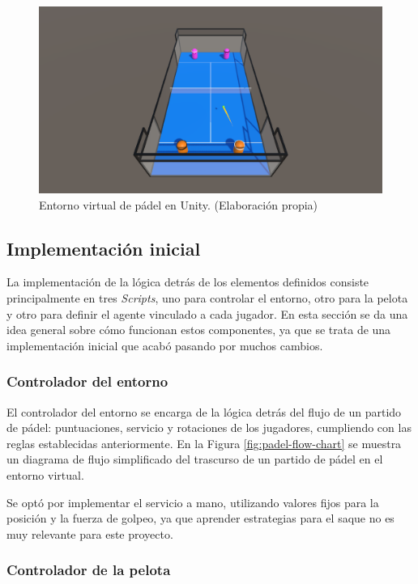 \begin{figure}[H]
    \centering
    \includegraphics[width=\textwidth]{figures/pista-padel.png}
    \caption[Entorno virtual de pádel en Unity]{Entorno virtual de pádel en Unity. (Elaboración propia)}
    \label{fig:pista-padel}
\end{figure}

\subsection{Implementación inicial}

La implementación de la lógica detrás de los elementos definidos consiste principalmente en tres \emph{Scripts}, uno para controlar el entorno, otro para la pelota y otro para definir el agente vinculado a cada jugador. En esta sección se da una idea general sobre cómo funcionan estos componentes, ya que se trata de una implementación inicial que acabó pasando por muchos cambios.

\subsubsection{Controlador del entorno}

El controlador del entorno se encarga de la lógica detrás del flujo de un partido de pádel: puntuaciones, servicio y rotaciones de los jugadores, cumpliendo con las reglas establecidas anteriormente. En la Figura \ref{fig:padel-flow-chart} se muestra un diagrama de flujo simplificado del trascurso de un partido de pádel en el entorno virtual.

Se optó por implementar el servicio a mano, utilizando valores fijos para la posición y la fuerza de golpeo, ya que aprender estrategias para el saque no es muy relevante para este proyecto.

\subsubsection{Controlador de la pelota}

